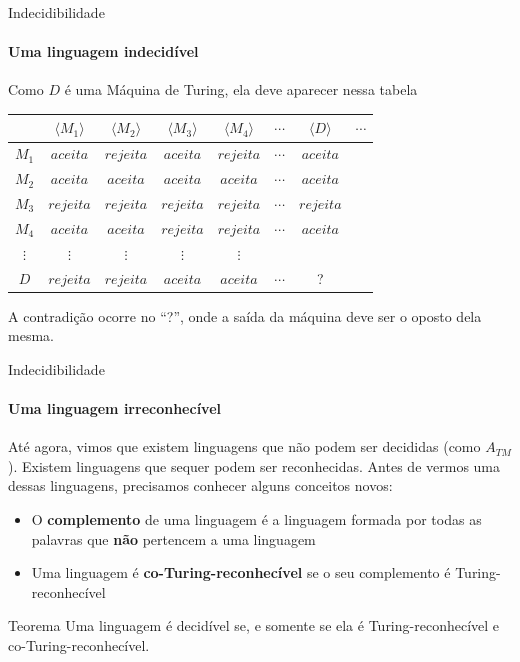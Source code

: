 \documentclass{beamer}
\begin{document}
\begin{frame}{Indecidibilidade}
	\framesubtitle{Uma linguagem indecidível}
	Como $D$ é uma Máquina de Turing, ela deve aparecer nessa tabela
	
	\begin{table}[!b]
	{\carlitoTLF
		\begin{tabular}{c|ccccccc}
			& \textbf{$\langle M_{1}\rangle$} & \textbf{$\langle M_{2}\rangle$} & \textbf{$\langle M_{3}\rangle$} & \textbf{$\langle M_{4}\rangle$} & $\cdots$ & \textbf{$\langle D\rangle$} & $\cdots$ \\
			\hline
			$M_{1}$ & \underline{$aceita$} & $rejeita$ & $aceita$ & $rejeita$ & $\cdots$ & $aceita$ & \\
			$M_{2}$ & $aceita$ & \underline{$aceita$} & $aceita$ & $aceita$ & $\cdots$ & $aceita$ & \\
			$M_{3}$ & $rejeita$ & $rejeita$ & \underline{$rejeita$} & $rejeita$ & $\cdots$ & $rejeita$ & \\
			$M_{4}$ & $aceita$ & $aceita$ & $rejeita$ & \underline{$rejeita$} & $\cdots$ & $aceita$ & \\
			$\vdots$ & $\vdots$ & $\vdots$ & $\vdots$ & $\vdots$ & & & \\
			$D$ & $rejeita$ & $rejeita$ & $aceita$ & $aceita$ & $\cdots$ & ? & \\
		\end{tabular}}
	\end{table}
	A contradição ocorre no ``?'', onde a saída da máquina deve ser o oposto dela mesma.
\end{frame}
\begin{frame}{Indecidibilidade}
	\framesubtitle{Uma linguagem irreconhecível}
	Até agora, vimos que existem linguagens que não podem ser decididas (como $A_{TM}$). Existem linguagens que sequer podem ser reconhecidas. Antes de vermos uma dessas linguagens, precisamos conhecer alguns conceitos novos:
	\begin{itemize}
		\item O \textbf{complemento} de uma linguagem é a linguagem formada por todas as palavras que \textbf{não} pertencem a uma linguagem
		\item Uma linguagem é \textbf{co-Turing-reconhecível} se o seu complemento é Turing-reconhecível
	\end{itemize}\pause
	\begin{block}{Teorema}
		Uma linguagem é decidível se, e somente se ela é Turing-reconhecível e co-Turing-reconhecível.
	\end{block}
\end{frame}
\end{document}
